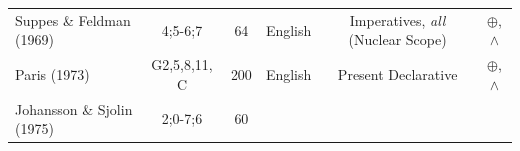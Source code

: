 \documentclass[oneside]{report}
\theoremstyle{definition}
\theoremstyle{definition}
\theoremstyle{definition}
\theoremstyle{remark}
\begin{document}
\begin{longtable}[]{@{}lcclcc@{}}
\begin{minipage}[t]{0.17\columnwidth}
Suppes \& Feldman (1969)\strut
\end{minipage} & \begin{minipage}[t]{0.09\columnwidth}\centering\strut
4;5-6;7\strut
\end{minipage} & \begin{minipage}[t]{0.09\columnwidth}\centering\strut
64\strut
\end{minipage} & \begin{minipage}[t]{0.06\columnwidth}\raggedright\strut
English\strut
\end{minipage} & \begin{minipage}[t]{0.31\columnwidth}\centering\strut
Imperatives, \emph{all} (Nuclear Scope)\strut
\end{minipage} & \begin{minipage}[t]{0.12\columnwidth}\centering\strut
\(\oplus\), \(\land\)\strut
\end{minipage}\tabularnewline
\begin{minipage}[t]{0.17\columnwidth}\raggedright\strut
Paris (1973)\strut
\end{minipage} & \begin{minipage}[t]{0.09\columnwidth}\centering\strut
G2,5,8,11, C\strut
\end{minipage} & \begin{minipage}[t]{0.09\columnwidth}\centering\strut
200\strut
\end{minipage} & \begin{minipage}[t]{0.06\columnwidth}\raggedright\strut
English\strut
\end{minipage} & \begin{minipage}[t]{0.31\columnwidth}\centering\strut
Present Declarative\strut
\end{minipage} & \begin{minipage}[t]{0.12\columnwidth}\centering\strut
\(\oplus\), \(\land\)\strut
\end{minipage}\tabularnewline
\begin{minipage}[t]{0.17\columnwidth}\raggedright\strut
Johansson \& Sjolin (1975)\strut
\end{minipage} & \begin{minipage}[t]{0.09\columnwidth}\centering\strut
2;0-7;6\strut
\end{minipage} & \begin{minipage}[t]{0.09\columnwidth}\centering\strut
60\strut
\end{minipage} & \begin{minipage}[t]{0.06\columnwidth}\raggedright\strut

\end{minipage}
\end{longtable}
\end{document}
